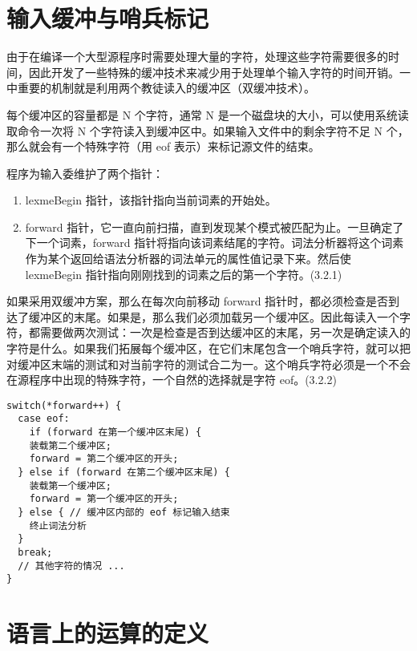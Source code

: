 \section*{输入缓冲与哨兵标记}

由于在编译一个大型源程序时需要处理大量的字符，处理这些字符需要很多的时间，因此开发了一些特殊的缓冲技术来减少用于处理单个输入字符的时间开销。一中重要的机制就是利用两个教徒读入的缓冲区（双缓冲技术）。

每个缓冲区的容量都是 N 个字符，通常 N 是一个磁盘块的大小，可以使用系统读取命令一次将 N 个字符读入到缓冲区中。如果输入文件中的剩余字符不足 N 个，那么就会有一个特殊字符（用 eof 表示）来标记源文件的结束。

程序为输入委维护了两个指针：
\begin{enumerate}
\item lexmeBegin 指针，该指针指向当前词素的开始处。
\item forward 指针，它一直向前扫描，直到发现某个模式被匹配为止。一旦确定了下一个词素，forward 指针将指向该词素结尾的字符。词法分析器将这个词素作为某个返回给语法分析器的词法单元的属性值记录下来。然后使 lexmeBegin 指针指向刚刚找到的词素之后的第一个字符。(3.2.1)
\end{enumerate}

如果采用双缓冲方案，那么在每次向前移动 forward 指针时，都必须检查是否到达了缓冲区的末尾。如果是，那么我们必须加载另一个缓冲区。因此每读入一个字符，都需要做两次测试：一次是检查是否到达缓冲区的末尾，另一次是确定读入的字符是什么。如果我们拓展每个缓冲区，在它们末尾包含一个哨兵字符，就可以把对缓冲区末端的测试和对当前字符的测试合二为一。这个哨兵字符必须是一个不会在源程序中出现的特殊字符，一个自然的选择就是字符 eof。(3.2.2)

\pagebreak
\begin{lstlisting}[caption={带有哨兵标记的forward指针移动算法}]
switch(*forward++) {
  case eof:
    if (forward 在第一个缓冲区末尾) {
    装载第二个缓冲区;
    forward = 第二个缓冲区的开头;
  } else if (forward 在第二个缓冲区末尾) {
    装载第一个缓冲区;
    forward = 第一个缓冲区的开头;
  } else { // 缓冲区内部的 eof 标记输入结束
    终止词法分析
  }
  break;
  // 其他字符的情况 ...
}
\end{lstlisting}






\section*{语言上的运算的定义}

